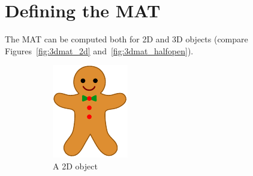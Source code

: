 \section{Defining the MAT}
The MAT can be computed both for 2D and 3D objects (compare Figures~\ref{fig:3dmat_2d} and~\ref{fig:3dmat_halfopen}).
\begin{figure}
	\centering
	\begin{subfigure}[b]{0.25\linewidth}
		\centering
		\includegraphics[width=\textwidth]{figs/gingerbreadman_whole.pdf}
		\caption{A 2D object}
		\label{fig:gbm:whole}
	\end{subfigure}
	\qquad%
	\begin{subfigure}[b]{0.25\linewidth}
		\centering

\end{subfigure}
\end{figure}
